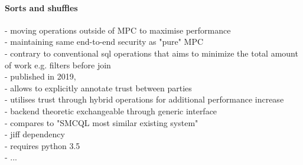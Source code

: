 \paragraph{Sorts and shuffles}   



- moving operations outside of MPC to maximise performance\\
- maintaining same end-to-end security as "pure" MPC     \\
- contrary to conventional sql operations that aims to minimize the total amount of work e.g. filters before join \\


- published in 2019,\\
- allows to explicitly annotate trust between parties\\
- utilises trust through hybrid operations for additional performance increase \\

- backend theoretic exchangeable through generic interface\\


- compares to "SMCQL most similar existing system"\\
- jiff dependency \\
- requires python 3.5 \\
- ...